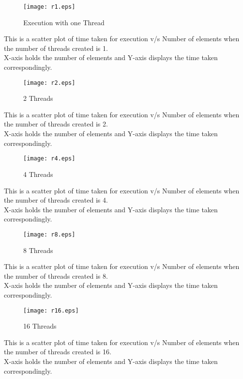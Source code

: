 \documentclass[20pt]{article}
\begin{document}
\maketitle
\clearpage

\begin{figure}
\texttt{[image: r1.eps]}
\caption{Execution with one Thread}
\label{fig:Scatter1 graph}
\end{figure}
\noindent
This is a scatter plot of time taken for execution v/s Number of
elements when the number of threads created is 1. \\
X-axis holds the number of elements  and
Y-axis displays the time taken correspondingly.
\clearpage

\begin{figure}
\texttt{[image: r2.eps]}
\caption{2 Threads}
\label{fig:Scatter2 graph}
\end{figure}
\noindent
This is a scatter plot of time taken for execution v/s Number of
elements when the number of threads created is 2. \\
X-axis holds the number of elements  and
Y-axis displays the time taken correspondingly.
\clearpage

\begin{figure}
\texttt{[image: r4.eps]}
\caption{4 Threads}
\label{fig:Scatter3 graph}
\end{figure}
\noindent
This is a scatter plot of time taken for execution v/s Number of
elements when the number of threads created is 4.
\\
X-axis holds the number of elements  and
Y-axis displays the time taken correspondingly.
\clearpage

\begin{figure}
\texttt{[image: r8.eps]}
\caption{8 Threads}
\label{fig:Scatter4 graph}
\end{figure}
\noindent
This is a scatter plot of time taken for execution v/s Number of
elements when the number of threads created is 8. \\
X-axis holds the number of elements  and
Y-axis displays the time taken correspondingly.
\clearpage

\begin{figure}
\texttt{[image: r16.eps]}
\caption{16 Threads}
\label{fig:Scatter5 graph}
\end{figure}
\noindent
This is a scatter plot of time taken for execution v/s Number of
elements when the number of threads created is 16. \\
X-axis holds the number of elements  and
Y-axis displays the time taken correspondingly.
\clearpage
\end{document}
